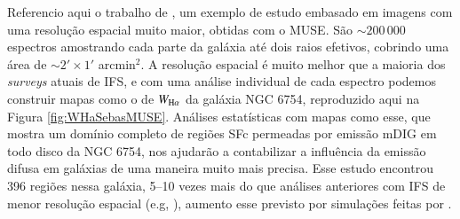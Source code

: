Referencio aqui o trabalho de \citet{Sanchez.etal.2015MUSE}, um exemplo de estudo embasado em imagens com uma resolução espacial muito maior, obtidas com o MUSE. São $\sim 200\,000$ espectros amostrando cada parte da galáxia até dois raios efetivos, cobrindo uma área de $\sim 2' \times 1'$ arcmin$^2$. A resolução espacial é muito melhor que a maioria dos {\em surveys} atuais de IFS, e com uma análise individual de cada espectro podemos construir mapas como o de $W_{\Ha}$ da galáxia NGC 6754, reproduzido aqui na Figura \ref{fig:WHaSebasMUSE}. Análises estatísticas com mapas como esse, que mostra um domínio completo de regiões SFc permeadas por emissão mDIG em todo disco da NGC 6754, nos ajudarão a contabilizar a influência da emissão difusa em galáxias de uma maneira muito mais precisa. Esse estudo encontrou 396 regiões \hii nessa galáxia, 5--10 vezes mais do que análises anteriores com IFS de menor resolução espacial (e.g, \citealt{Sanchez.etal.2013a}), aumento esse previsto por simulações feitas por \citet{Mast.etal.2014}.

